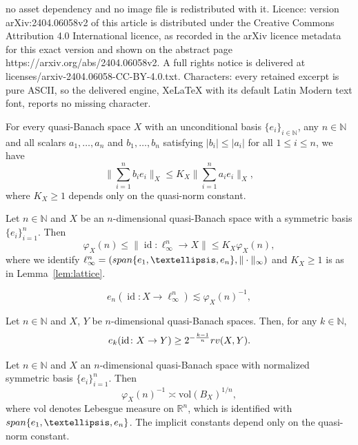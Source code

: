 \documentclass[10pt,a4paper]{amsart}
\DeclareMathOperator{\id}{id}
\newcommand{\IN}{\mathbb{N}}
\newcommand{\IR}{\mathbb{R}}
\newcommand{\N}{\mathbb{N}}
\newcommand{\vol}{\mathrm{vol}}
\begin{document}
no asset dependency and no image file is redistributed with it. Licence: version arXiv:2404.06058v2 of this article is distributed under the Creative Commons Attribution 4.0 International licence, as recorded in the arXiv licence metadata for this exact version and shown on the abstract page https://arxiv.org/abs/2404.06058v2. A full rights notice is delivered at licenses/arxiv-2404.06058-CC-BY-4.0.txt. Characters: every retained excerpt is pure ASCII, so the delivered engine, XeLaTeX with its default Latin Modern text font, reports no missing character.
\begin{lem}\label{lem:lattice}
For every quasi-Banach space $X$ with an unconditional basis $\{e_i\}_{i\in\N}$, any $n\in\IN$ and all scalars $a_1,\dots,a_n$ and $b_1,\dots,b_n$ satisfying $|b_i|\le |a_i|$ for all $1\le i\le n$, we have
\[
\Big\| \sum_{i=1}^{n}b_i e_i\Big\|_X
\le K_X\Big\| \sum_{i=1}^{n}a_i e_i\Big\|_X,
\]
where $K_X\ge 1$ depends only on the quasi-norm constant.
\end{lem}

\begin{lem}\label{lem:monotone-fundamental}
Let $n\in\N$ and $X$ be an $n$-dimensional quasi-Banach space with a symmetric basis $\{e_i\}_{i=1}^n$. Then
\[
\varphi_X(n)
\le \|\id\colon \ell_{\infty}^n\to X\|
\le K_X \varphi_X(n),
\]
where we identify $\ell_{\infty}^n=({\rm span}\{e_1,\dots,e_n\},\|\cdot\|_{\infty})$ and $K_X\geq 1$ is as in Lemma~\ref{lem:lattice}.
\end{lem}

\begin{equation} \label{eq:en-fundamental}
e_n(\id\colon X\to \ell_{\infty}^n)
\lesssim  \varphi_X(n)^{-1},
\end{equation}

\begin{lem}\label{lem:vol-lower}
Let $n\in\N$ and $X$, $Y$ be $n$-dimensional quasi-Banach spaces. Then, for any $k\in\IN$,
\[
e_k(\id\colon X\to Y) \ge 2^{-\frac{k-1}{n}}{\rm rv}(X,Y).%
\]
\end{lem}

\begin{prop}\label{pro:fundamental-vol}
Let $n\in\N$ and $X$ an $n$-dimensional quasi-Banach space with normalized symmetric basis $\{e_i\}_{i=1}^n$. Then
\[
\varphi_X(n)^{-1}\asymp \vol(B_X)^{1/n}, 
\]
where $\vol$ denotes Lebesgue measure on $\IR^n$, which is identified with ${\rm span}\{e_1,\dots,e_n\}$. The implicit constants depend only on the quasi-norm constant.
\end{prop}
\end{document}
